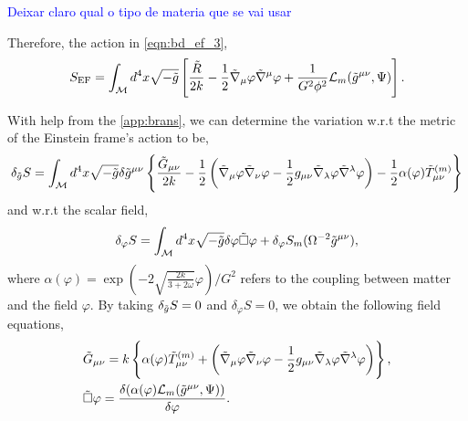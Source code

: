 \textcolor{blue}{Deixar claro qual o tipo de materia que se vai usar}

Therefore, the action in \cref{eqn:bd_ef_3},
\begin{equation}
    S_{\text{EF}}=\int_{\mathcal{M}} d^4x\sqrt{-\Tilde{g}}\left[\frac{\Tilde{R}}{2k}-\frac{1}{2}\Tilde{\nabla}_\mu\varphi\Tilde{\nabla}^\mu\varphi+\frac{1}{G^2\phi^2}\mathcal{L}_m(\Tilde{g}^{\mu\nu},\Psi)\right].
    \label{eqn:bd_ef_4}
\end{equation}

With help from the \cref{app:brans}, we can determine the variation w.r.t the metric of the Einstein frame's action to be,
\begin{equation}
    \delta_{\Tilde{g}} S = \int_{\mathcal{M}} d^4x\sqrt{-\Tilde{g}} \delta \Tilde{g}^{\mu\nu}\left\{\frac{\Tilde{G}_{\mu\nu}}{2k}-\frac{1}{2}\left(\Tilde{\nabla}_\mu\varphi\Tilde{\nabla}_\nu\varphi-\frac{1}{2}g_{\mu\nu}\Tilde{\nabla}_\lambda\varphi\Tilde{\nabla}^\lambda\varphi\right)-\frac{1}{2}\alpha(\varphi)\Tilde{T}_{\mu\nu}^{(m)}\right\}
\end{equation}
and w.r.t the scalar field,
\begin{equation}
    \delta_\varphi S=  \int_{\mathcal{M}} d^4x\sqrt{-\Tilde{g}}\delta\varphi \Tilde{\Box}\varphi +\delta_\varphi S_m(\Omega^{-2}\tilde{g}^{\mu\nu}),
\end{equation}
where $\alpha(\varphi)=\exp\left(-2\sqrt{\frac{2k}{3+2\omega}}\varphi\right)/G^2$ refers to the coupling between matter and the field $\varphi$. By taking $\delta_{\Tilde{g}} S=0$ and $\delta_\varphi S=0$, we obtain the following field equations,
\begin{align}
    &\Tilde{G}_{\mu\nu}=k\left\{ \alpha(\varphi)\Tilde{T}_{\mu\nu}^{(m)} + \left(\Tilde{\nabla}_\mu\varphi\Tilde{\nabla}_\nu\varphi-\frac{1}{2}g_{\mu\nu}\Tilde{\nabla}_\lambda\varphi\Tilde{\nabla}^\lambda\varphi\right) \right\},\label{eqn:field_metric_ef}\\
    &\Tilde{\Box}\varphi=\frac{\delta(\alpha(\varphi)\mathcal{L}_m(\Tilde{g}^{\mu\nu},\Psi))}{\delta\varphi}.\label{eqn:field_scalar_ef}
\end{align}



